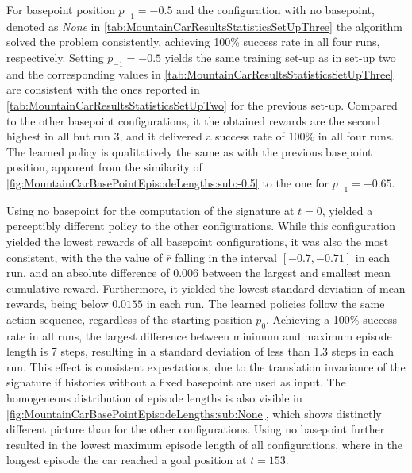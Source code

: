 \documentclass[
    a4paper,
    11pt,
    bibliography=totoc,
    listof=totoc,      
    headinclude=true,
    cleardoublepage=empty,
]{scrbook}
\theoremstyle{plain}
\theoremstyle{definition}
\theoremstyle{remark}
\begin{document}
For basepoint position $p_{-1}=-0.5$ and the configuration with no 
basepoint, denoted as \textit{None} in
\cref{tab:MountainCarResultsStatisticsSetUpThree} the algorithm solved the
problem consistently, achieving 100\% success rate in all four runs,
respectively. Setting $p_{-1}=-0.5$ yields the same training set-up as in 
set-up two and the corresponding values in
\cref{tab:MountainCarResultsStatisticsSetUpThree} are consistent with the 
ones reported in \cref{tab:MountainCarResultsStatisticsSetUpTwo} for the 
previous set-up. Compared to the other basepoint configurations, it the 
obtained rewards are the second highest in all but run 3, and it 
delivered a success rate of 100\% in all four runs. The learned policy is 
qualitatively the same as with the previous basepoint position, apparent 
from the similarity of
\cref{fig:MountainCarBasePointEpisodeLengths:sub:-0.5} to the one for 
$p_{-1} = -0.65$.

Using no basepoint for the computation of the signature at $t=0$, 
yielded a perceptibly different policy to the other configurations. While 
this configuration yielded the lowest rewards of all basepoint 
configurations, it was also the most consistent, with the the value of 
$\overline r$ falling in the interval $[-0.7, -0.71]$ in each run, and an 
absolute difference of $0.006$ between the largest and smallest mean 
cumulative reward. Furthermore, it yielded the lowest standard deviation 
of mean rewards, being below $0.0155$ in each run. The learned policies 
follow the same action sequence, regardless of the starting position 
$p_0$. Achieving a 100\% success rate in all runs, the largest difference 
between minimum and maximum episode length is 7 steps, resulting in a 
standard deviation of less than 1.3 steps in each run. This effect is 
consistent expectations, due to the translation invariance of the 
signature if histories without a fixed basepoint are used as input. The 
homogeneous distribution of episode lengths is also visible in
\cref{fig:MountainCarBasePointEpisodeLengths:sub:None}, which shows 
distinctly different picture than for the other configurations. Using no 
basepoint further resulted in the lowest maximum episode length of all 
configurations, where in the longest episode the car reached a goal 
position at $t=153$.
\end{document}
